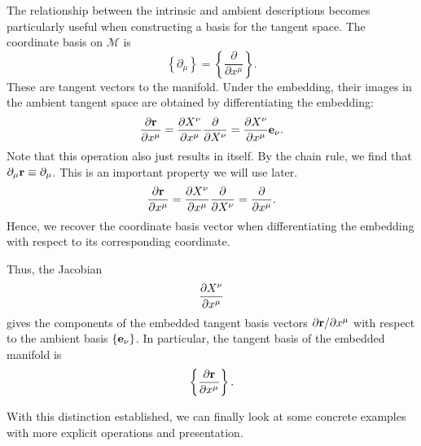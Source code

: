 		The relationship between the intrinsic and ambient descriptions becomes
		particularly useful when constructing a basis for the tangent space.
		The coordinate basis on $\mathcal M$ is
		\[
			\left\{
				\partial_\mu
			\right\}
			=
			\left\{
				\frac{\partial}{\partial x^\mu}
			\right\}.
		\]
		These are tangent vectors to the manifold. Under the embedding, their
		images in the ambient tangent space are obtained by differentiating
		the embedding:
		\[
			\pdv{\vb r}{x^\mu}
			=
			\pdv{X^\nu}{x^\mu}
			\pdv{}{X^\nu}
			=
			\pdv{X^\nu}{x^\mu}\vb e_\nu.
		\]
		Note that this operation also just results in itself. By the chain rule, we find that $\partial_\mu\vb{r}\equiv \partial_\mu$. This is an important property we will use later.
		\begin{equation}
			\label{eq:vector-embed-eqiuvalence}
			\pdv{\vb{r}}{x^\mu}
			=
			\pdv{X^\nu}{x^\mu}\pdv{}{X^\nu}
			=
			\pdv{}{x^\mu}.
		\end{equation}
		Hence, we recover the coordinate basis vector when differentiating the
		embedding with respect to its corresponding coordinate.

		Thus, the Jacobian
		\[
			\pdv{X^\nu}{x^\mu}
		\]
		gives the components of the embedded tangent basis vectors
		$\partial\vb r/\partial x^\mu$ with respect to the ambient basis
		$\{\vb e_\nu\}$. In particular, the tangent basis of the embedded
		manifold is
		\[
			\left\{
				\pdv{\vb r}{x^\mu}
			\right\}.
		\]

		With this distinction established, we can finally look at some concrete
		examples with more explicit operations and presentation.

